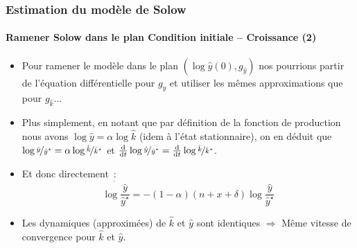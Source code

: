 \documentclass[10pt,notheorems]{beamer}
\theoremstyle{plain}
\theoremstyle{definition} %
\begin{document}
\begin{frame}
  \frametitle{Estimation du modèle de Solow}
  \framesubtitle{Ramener Solow dans le plan Condition initiale -- Croissance (2)}

  \begin{itemize}

  \item Pour ramener le modèle dans le plan $(\log \hat y(0), g_{\hat y})$ nos pourrions partir de l'équation différentielle pour $g_{\hat y}$ et utiliser les mêmes approximations que pour $g_{\hat k}$... \newline

  \item Plus simplement, en notant que par définition de la fonction de production nous avons $\log\hat y = \alpha\log\hat k$ (idem à l'état stationnaire), on en déduit que $\log \nicefrac{\hat y}{\hat y^{\star}} = \alpha \log \nicefrac{\hat k}{\hat k^{\star}}$ et $\frac{\mathrm d}{\mathrm dt}\log\nicefrac{\hat y}{\hat y^{\star}} = \frac{\mathrm d}{\mathrm dt}\log\nicefrac{\hat k}{\hat k^{\star}}$.\newline

  \item Et donc directement~:
    \[
      \dot{\log\frac{\hat y}{\hat y^{\star}}} = -(1-\alpha)(n+x+\delta)\log\frac{\hat y}{\hat y^{\star}}
    \]

    \bigskip

  \item Les dynamiques (approximées) de $\hat k$ et $\hat y$ sont identiques $\Longrightarrow$ Même vitesse de convergence pour $\hat k$ et $\hat y$.

  \end{itemize}

\end{frame}
\end{document}
